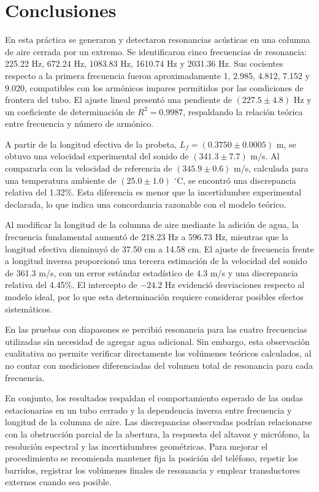 \section{Conclusiones}
En esta práctica se generaron y detectaron resonancias acústicas en una columna de aire cerrada por un extremo. Se identificaron cinco frecuencias de resonancia: 225.22 Hz, 672.24 Hz, 1083.83 Hz, 1610.74 Hz y 2031.36 Hz. Sus cocientes respecto a la primera frecuencia fueron aproximadamente 1, 2.985, 4.812, 7.152 y 9.020, compatibles con los armónicos impares permitidos por las condiciones de frontera del tubo. El ajuste lineal presentó una pendiente de $(227.5\pm4.8)$ Hz y un coeficiente de determinación de $R^2=0.9987$, respaldando la relación teórica entre frecuencia y número de armónico.

\balance

A partir de la longitud efectiva de la probeta, $L_f=(0.3750\pm0.0005)$ m, se obtuvo una velocidad experimental del sonido de $(341.3\pm7.7)$ m/s. Al compararla con la velocidad de referencia de $(345.9\pm0.6)$ m/s, calculada para una temperatura ambiente de $(25.0\pm1.0)$ $^\circ$C, se encontró una discrepancia relativa del 1.32\%. Esta diferencia es menor que la incertidumbre experimental declarada, lo que indica una concordancia razonable con el modelo teórico.

Al modificar la longitud de la columna de aire mediante la adición de agua, la frecuencia fundamental aumentó de 218.23 Hz a 596.73 Hz, mientras que la longitud efectiva disminuyó de 37.50 cm a 14.58 cm. El ajuste de frecuencia frente a longitud inversa proporcionó una tercera estimación de la velocidad del sonido de 361.3 m/s, con un error estándar estadístico de 4.3 m/s y una discrepancia relativa del 4.45\%. El intercepto de $-24.2$ Hz evidenció desviaciones respecto al modelo ideal, por lo que esta determinación requiere considerar posibles efectos sistemáticos.

En las pruebas con diapasones se percibió resonancia para las cuatro frecuencias utilizadas sin necesidad de agregar agua adicional. Sin embargo, esta observación cualitativa no permite verificar directamente los volúmenes teóricos calculados, al no contar con mediciones diferenciadas del volumen total de resonancia para cada frecuencia.

En conjunto, los resultados respaldan el comportamiento esperado de las ondas estacionarias en un tubo cerrado y la dependencia inversa entre frecuencia y longitud de la columna de aire. Las discrepancias observadas podrían relacionarse con la obstrucción parcial de la abertura, la respuesta del altavoz y micrófono, la resolución espectral y las incertidumbres geométricas. Para mejorar el procedimiento se recomienda mantener fija la posición del teléfono, repetir los barridos, registrar los volúmenes finales de resonancia y emplear transductores externos cuando sea posible.

